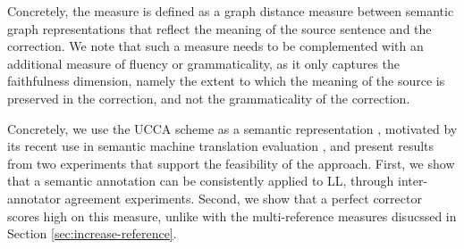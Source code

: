 		Concretely, the measure is defined as a graph distance measure between
		semantic graph representations that reflect the meaning of the source
		sentence and the correction.
		We note that such a measure needs to be complemented with an additional
		measure of fluency or grammaticality, as it only captures
		the faithfulness dimension, namely the extent to which
		the meaning of the source is preserved in the correction,
		and not the grammaticality of the correction.
		
		Concretely,
		we use the UCCA scheme as a semantic representation \cite{abend2013universal}, motivated by
		its recent use in semantic machine translation evaluation \cite{birch2016hume},
		and present results from two experiments that support the feasibility of the approach.
		First, we show that a semantic annotation can be consistently applied to LL,
		through inter-annotator agreement experiments.
		Second, we show that a perfect corrector scores high on this measure, unlike with
		the multi-reference measures disucssed in Section \ref{sec:increase-reference}.
		
		
		
